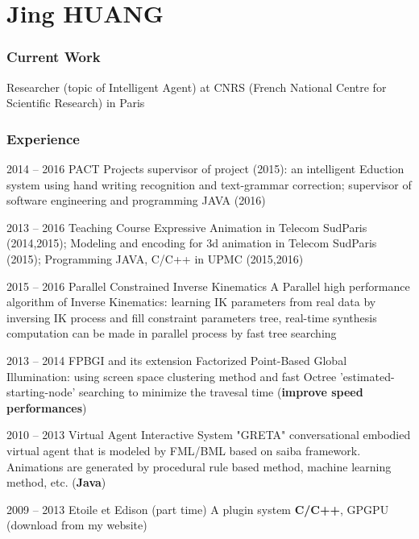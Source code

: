 \documentclass{tccv}
\begin{document}
\part{Jing HUANG}
\section{Current Work}
Researcher (topic of Intelligent Agent) at CNRS (French National Centre for Scientific Research) in Paris

\section{Experience}
\begin{eventlist}
\item{2014 -- 2016}
     {PACT Projects}
     {supervisor of project (2015): an intelligent Eduction system using hand writing recognition and text-grammar correction; supervisor of software engineering and programming JAVA (2016)}
		
\item{2013 -- 2016}
     {Teaching Course}
     {Expressive Animation in Telecom SudParis (2014,2015); Modeling and encoding for 3d animation in Telecom SudParis (2015);
			Programming JAVA, C/C++ in UPMC (2015,2016)}
			
\item{2015 -- 2016}
     {Parallel Constrained Inverse Kinematics}
     {A Parallel high performance algorithm of Inverse Kinematics: learning IK parameters from real data by inversing IK process and fill constraint parameters tree, real-time synthesis computation can be made in parallel process by fast tree searching}
		
\item{2013 -- 2014}
     {FPBGI and its extension}
     {Factorized Point-Based Global Illumination: using screen space clustering method and fast Octree 'estimated-starting-node' searching to minimize the travesal time (\textbf{improve speed performances})}

\item{2010 -- 2013}
     {Virtual Agent Interactive System "GRETA"}
		 {conversational embodied virtual agent that is modeled by FML/BML based on saiba framework. Animations are generated by procedural rule based method, machine learning method, etc. 
		(\textbf{Java})
		}
		
\item{2009 -- 2013}
     {Etoile et Edison (part time)}
     {A plugin system \textbf{C/C++}, GPGPU (download from my website)}
		

\end{eventlist}
\end{document}
